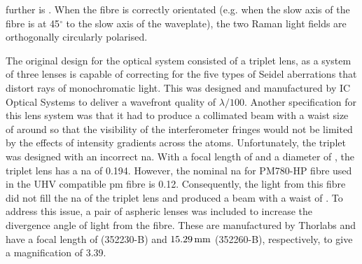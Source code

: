 further is . When the fibre is correctly
orientated (e.g. when the slow axis of the fibre is at 45$^\circ$ to the slow
axis of the waveplate), the two Raman light fields are orthogonally circularly
polarised. \par\noindent The original design for the optical system consisted of
a triplet lens, as a system of three lenses is capable of correcting for the
five types of Seidel aberrations that distort rays of monochromatic light. This
was designed and manufactured by IC Optical Systems to deliver a
wavefront quality of $\lambda/100$. Another specification for
this lens system was that it had to produce a collimated beam with a waist size
of around  so that the visibility of the
interferometer fringes would not be limited by the effects of intensity gradients across the
atoms. Unfortunately, the triplet was designed with an incorrect \ac{na}. With a
focal length of  and a diameter of
, the triplet lens has a \ac{na} of 0.194. However,
the nominal \ac{na} for PM780-HP fibre used in the UHV compatible \ac{pm} fibre
is 0.12. Consequently, the light from this fibre did not fill the \ac{na} of the
triplet lens and produced a beam with a waist of . 
To address this issue, a pair of aspheric lenses was included to increase
the divergence angle of light from the fibre. These are manufactured by Thorlabs
and have a focal length of  (352230-B) and
\(\sivalue{15.29}{\milli\metre}\) (352260-B), respectively, to give a
magnification of 3.39.
